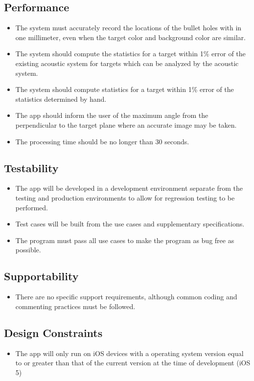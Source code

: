 \subsection{Performance}
\begin{itemize}
\item The system must accurately record the locations of the bullet holes with in one millimeter, even when the target color and background color are similar.
\item The system should compute the statistics for a target within 1\% error of the existing acoustic system for targets which can be analyzed by the acoustic system.
\item The system should compute statistics for a target within 1\% error of the statistics determined by hand.
\item The app should inform the user of the maximum angle from the perpendicular to the target plane where an accurate image may be taken.
\item The processing time should be no longer than 30 seconds.
\end{itemize}
\subsection{Testability}
\begin{itemize}
\item The app will be developed in a development environment separate from the testing and production environments to allow for regression testing to be performed.
\item Test cases will be built from the use cases and supplementary specifications.
\item The program must pass all use cases to make the program as bug free as possible.
\end{itemize}
\subsection{Supportability}
\begin{itemize}
\item There are no specific support requirements, although common coding and commenting practices must be followed.
\end{itemize}
\subsection{Design Constraints}
\begin{itemize}
\item The app will only run on iOS devices with a operating system version equal to or greater than that of the current version at the time of development (iOS 5)
\end{itemize}
